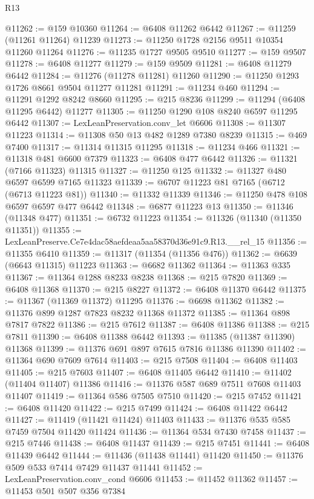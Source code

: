 \begin{lexlean}{R13}
\begin{coremodule}
@11262 := @159 @10360
@11264 := @6408 @11262 @6442
@11267 := @11259 (@11261 @11264) @11239
@11273 := @11250 @1728 @2156 @9511 @10354 @11260 @11264
@11276 := @11235 @1727 @9505 @9510
@11277 := @159 @9507
@11278 := @6408 @11277
@11279 := @159 @9509
@11281 := @6408 @11279 @6442
@11284 := @11276 (@11278 @11281) @11260
@11290 := @11250 @1293 @1726 @8661 @9504 @11277 @11281
@11291 := @11234 @460
@11294 := @11291 @1292 @8242 @8660
@11295 := @215 @8236
@11299 := @11294 (@6408 @11295 @6442) @11277
@11305 := @11250 @1290 @108 @8240 @6597 @11295 @6442
@11307 := LexLeanPreservation.conv_let @6606
@11308 := @11307 @11223
@11314 := @11308 @50 @13 @482 @1289 @7380 @8239
@11315 := @469 @7400
@11317 := @11314 @11315 @11295
@11318 := @11234 @466
@11321 := @11318 @481 @6600 @7379
@11323 := @6408 @477 @6442
@11326 := @11321 (@7166 @11323) @11315
@11327 := @11250 @125
@11332 := @11327 @480 @6597 @6599 @7165 @11323
@11339 := @6707 @11223 @81 @7165 (@6712 (@6713 @11223 @81))
@11340 := @11332 @11339
@11346 := @11250 @478 @108 @6597 @6597 @477 @6442
@11348 := @6877 @11223 @13
@11350 := @11346 (@11348 @477)
@11351 := @6732 @11223
@11354 := @11326 (@11340 (@11350 @11351))
@11355 := LexLeanPreserve.Ce7e4dac58aefdeaa5aa58370d36e91c9.R13.__rel_15
@11356 := @11355 @6410
@11359 := @11317 (@11354 (@11356 @476))
@11362 := @6639 (@6643 @11315) @11223
@11363 := @6682 @11362
@11364 := @11363 @335
@11367 := @11364 @1288 @8233 @8238
@11368 := @215 @7820
@11369 := @6408 @11368
@11370 := @215 @8227
@11372 := @6408 @11370 @6442
@11375 := @11367 (@11369 @11372) @11295
@11376 := @6698 @11362
@11382 := @11376 @899 @1287 @7823 @8232 @11368 @11372
@11385 := @11364 @898 @7817 @7822
@11386 := @215 @7612
@11387 := @6408 @11386
@11388 := @215 @7811
@11390 := @6408 @11388 @6442
@11393 := @11385 (@11387 @11390) @11368
@11399 := @11376 @691 @897 @7615 @7816 @11386 @11390
@11402 := @11364 @690 @7609 @7614
@11403 := @215 @7508
@11404 := @6408 @11403
@11405 := @215 @7603
@11407 := @6408 @11405 @6442
@11410 := @11402 (@11404 @11407) @11386
@11416 := @11376 @587 @689 @7511 @7608 @11403 @11407
@11419 := @11364 @586 @7505 @7510
@11420 := @215 @7452
@11421 := @6408 @11420
@11422 := @215 @7499
@11424 := @6408 @11422 @6442
@11427 := @11419 (@11421 @11424) @11403
@11433 := @11376 @535 @585 @7459 @7504 @11420 @11424
@11436 := @11364 @534 @7430 @7458
@11437 := @215 @7446
@11438 := @6408 @11437
@11439 := @215 @7451
@11441 := @6408 @11439 @6442
@11444 := @11436 (@11438 @11441) @11420
@11450 := @11376 @509 @533 @7414 @7429 @11437 @11441
@11452 := LexLeanPreservation.conv_cond @6606
@11453 := @11452 @11362
@11457 := @11453 @501 @507 @356 @7384

\end{coremodule}
\end{lexlean}
